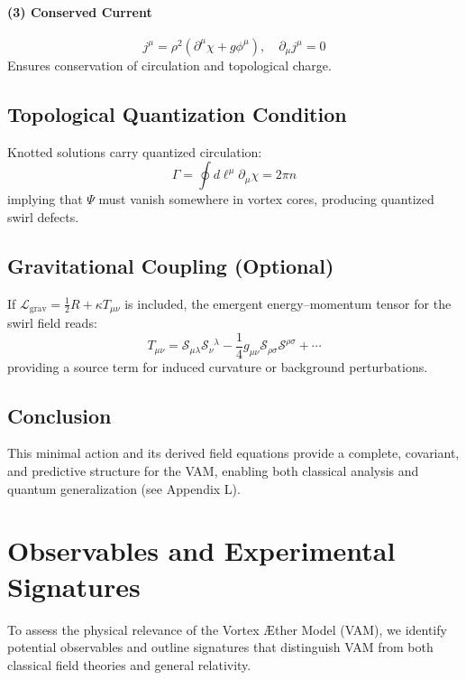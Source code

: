         \paragraph{(3) Conserved Current}
        \begin{equation}
            j^\mu = \rho^2 (\partial^\mu \chi + g \phi^\mu), \quad \partial_\mu j^\mu = 0
        \end{equation}
        Ensures conservation of circulation and topological charge.

        \subsection{Topological Quantization Condition}
        Knotted solutions carry quantized circulation:
        \begin{equation}
            \Gamma = \oint d\ell^\mu \partial_\mu \chi = 2\pi n
        \end{equation}
        implying that $\Psi$ must vanish somewhere in vortex cores, producing quantized swirl defects.

        \subsection{Gravitational Coupling (Optional)}
        If $\mathcal{L}_{\text{grav}} = \frac{1}{2} R + \kappa T_{\mu\nu}$ is included, the emergent energy--momentum tensor for the swirl field reads:
        \begin{equation}
            T_{\mu\nu} = \mathcal{S}_{\mu\lambda} \mathcal{S}_\nu{}^\lambda - \frac{1}{4} g_{\mu\nu} \mathcal{S}_{\rho\sigma} \mathcal{S}^{\rho\sigma} + \cdots
        \end{equation}
        providing a source term for induced curvature or background perturbations.

        \subsection{Conclusion}
        This minimal action and its derived field equations provide a complete, covariant, and predictive structure for the VAM, enabling both classical analysis and quantum generalization (see Appendix L).

        \section*{Observables and Experimental Signatures}
        To assess the physical relevance of the Vortex Æther Model (VAM), we identify potential observables and outline signatures that distinguish VAM from both classical field theories and general relativity.


